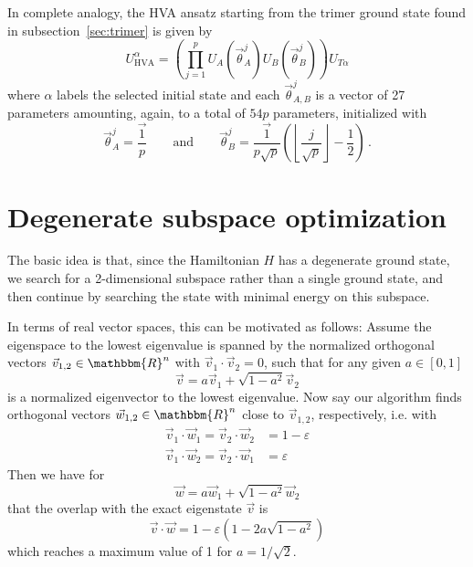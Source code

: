 \documentclass[a4paper,12pt]{article}
\newcommand{\R}{\mathbbm{R}}
\begin{document}
In complete analogy, the HVA ansatz starting from the trimer ground state found in subsection~\ref{sec:trimer} is given by
\begin{equation}\label{eqn:hva-trimer}
 U_\text{HVA}^\alpha
= \left(\prod_{j=1}^{p}
U_A(\vec \theta_A^j)
U_B(\vec \theta_B^j)
\right) U_{T\alpha}
\end{equation}
where $\alpha$ labels the selected initial state and each $\vec\theta_{A,B}^j$ is a vector of 27 parameters amounting, again, to a total of $54p$ parameters, initialized with
\begin{equation}\label{eqn:hva-trimer-initial-parameters}
\vec\theta_A^j = \frac{\vec{1}}{p} \qquad\text{and}\qquad
\vec\theta_B^j = \frac{\vec{1}}{p\sqrt{p}} \left(\left\lfloor\frac{j}{\sqrt{p}}\right\rfloor - \frac{1}{2}\right) \,.
\end{equation}

\section{Degenerate subspace optimization}
The basic idea is that, since the Hamiltonian $H$ has a degenerate ground state, we search for a 2-dimensional subspace rather than a single ground state, and then continue by searching the state with minimal energy on this subspace.

In terms of real vector spaces, this can be motivated as follows: Assume the eigenspace to the lowest eigenvalue is spanned by the normalized orthogonal vectors $\vec v_{1,2} \in \R^n$ with $\vec v_1 \cdot \vec v_2 = 0$, such that for any given $a \in [0,1]$
\begin{equation}
 \vec v = a \vec v_1 + \sqrt{1-a^2} \vec v_2
\end{equation}
is a normalized eigenvector to the lowest eigenvalue. Now say our algorithm finds orthogonal vectors $\vec w_{1,2} \in \R^n$ close to $\vec v_{1,2}$, respectively, i.e. with
\begin{subequations}\begin{align}
\vec v_1 \cdot \vec w_1 
= \vec v_2 \cdot \vec w_2
&= 1 - \varepsilon \\
\vec v_1 \cdot \vec w_2 
= \vec v_2 \cdot \vec w_1
&= \varepsilon
\end{align}\end{subequations}
Then we have for
\begin{equation}
 \vec w = a \vec w_1 + \sqrt{1-a^2} \vec w_2
\end{equation}
that the overlap with the exact eigenstate $\vec v$ is
\begin{equation}
\vec v \cdot \vec w = 1 - \varepsilon \left(1 - 2 a \sqrt{1-a^2}\right)
\end{equation}
which reaches a maximum value of 1 for $a = 1/\sqrt{2}$.
\end{document}
